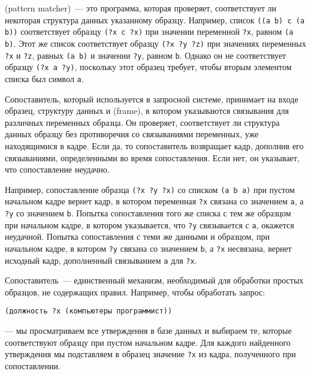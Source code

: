  (pattern matcher)~--- это
программа, которая проверяет, соответствует ли некоторая структура
данных указанному образцу.  Например, список {\tt ((a b) c (a
b))} соответствует образцу {\tt (?x c ?x)} при значении
переменной {\tt ?x}, равном {\tt (a b)}. Этот же список
соответствует образцу {\tt (?x ?y ?z)} при значениях переменных
{\tt ?x} и {\tt ?z}, равных {\tt (a b)} и
значении {\tt ?y}, равном {\tt b}.  Однако он не
соответствует образцу {\tt (?x a ?y)}, поскольку этот образец
требует, чтобы вторым элементом списка был символ {\tt a}.

Сопоставитель, который используется в запросной системе,
принимает на входе образец, структуру данных и 
 (frame), в котором указываются связывания для
различных переменных образца.  Он проверяет, соответствует ли
структура данных образцу без противоречия со
связываниями переменных, уже находящимися в кадре.  Если да, то сопоставитель
возвращает кадр, дополнив его связываниями, определенными во время
сопоставления.  Если нет, он указывает, что сопоставление
неудачно.

Например, сопоставление образца {\tt (?x ?y ?x)}
со списком {\tt (a b a)} при пустом начальном кадре вернет
кадр, в котором переменная {\tt ?x} связана со значением
{\tt a}, а {\tt ?y} со значением {\tt b}.
Попытка сопоставления того же списка с тем же образцом при начальном
кадре, в котором указывается, что {\tt ?y} связывается с
{\tt a}, окажется неудачной.  Попытка сопоставления с теми же
данными и образцом, при начальном кадре, в котором {\tt ?y}
связана со значением {\tt b}, а {\tt ?x} несвязана,
вернет исходный кадр, дополненный связыванием {\tt a} для
{\tt ?x}.

Сопоставитель~--- единственный
механизм, необходимый для 
обработки простых образцов, не содержащих правил.  Например, чтобы
обработать запрос:

\begin{Verbatim}[fontsize=\small]
(должность ?x (компьютеры программист))
\end{Verbatim}
--- мы просматриваем все утверждения в базе данных и выбираем те, которые
соответствуют образцу при пустом начальном кадре.  Для каждого
найденного утверждения мы подставляем в образец значение
{\tt ?x} из кадра, полученного при сопоставлении.

